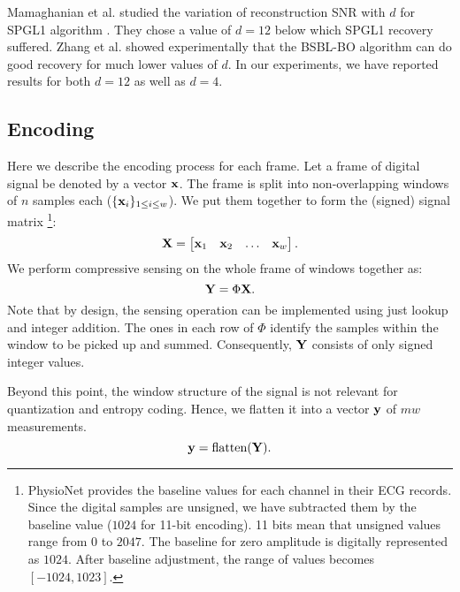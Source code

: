 Mamaghanian et al. \cite{mamaghanian2011compressed}
studied the variation of reconstruction SNR with $d$ for SPGL1
algorithm \cite{van2009probing}.
They chose a value of $d=12$ below which
SPGL1 recovery suffered. Zhang et al. \cite{zhang2012compressed}
showed experimentally that the BSBL-BO algorithm can do good
recovery for much lower values of $d$.
In our experiments, we have reported results for both $d=12$
as well as $d=4$.


\subsection{Encoding}


Here we describe the encoding process for each frame.
Let a frame of digital signal be denoted by a vector $\mathbf{x}$.
The frame is split into non-overlapping windows of $n$
samples each ($\{\mathbf{x}_i\}_{1 \le i\le w}$).
We put them together to form the (signed) signal matrix
\footnote{
PhysioNet provides the baseline values for each channel
in their ECG records.
Since the digital samples are unsigned, we have subtracted
them by the baseline value ($1024$ for 11-bit encoding).
11 bits mean that unsigned values range from
$0$ to $2047$. The baseline for zero amplitude is
digitally represented as $1024$.
After baseline adjustment, the range of values becomes
$[-1024,1023]$.
}:
\begin{equation}
\mathbf{X} = \begin{bmatrix}
\mathbf{x}_1 & \mathbf{x}_2 & \dots & \mathbf{x}_w
\end{bmatrix}.
\end{equation}
We perform compressive sensing on the whole frame
of windows together as:
\begin{equation}
\mathbf{Y} = \Phi \mathbf{X}.
\end{equation}
Note that by design, the sensing operation can be implemented
using just lookup and integer addition. The ones
in each row of $\Phi$ identify the samples within the window
to be picked up and summed. Consequently, $\mathbf{Y}$ consists of
only signed integer values.

Beyond this point, the window structure of the signal is not
relevant for quantization and entropy coding.
Hence, we flatten it into a vector $\mathbf{y}$ of $m w$ measurements.
\begin{equation}
\mathbf{y} = \text{flatten}(\mathbf{Y}).
\end{equation}
